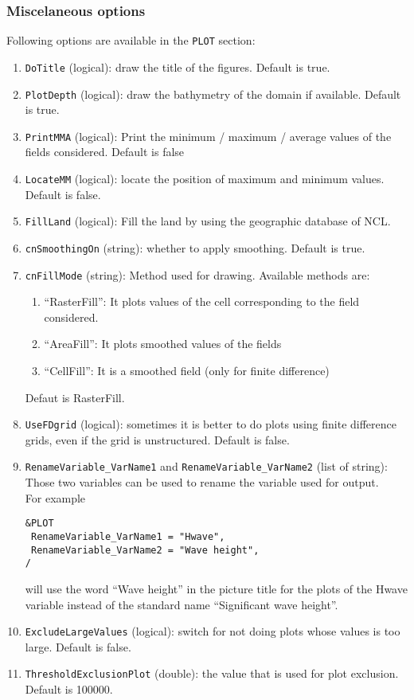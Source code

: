 \documentclass[12pt]{amsart}
\begin{document}
\subsubsection{Miscelaneous options}

Following options are available in the {\tt PLOT} section:
\begin{enumerate}
\item {\tt DoTitle} (logical): draw the title of the figures. Default is true.
\item {\tt PlotDepth} (logical): draw the bathymetry of the domain if available. Default is true.
\item {\tt PrintMMA} (logical): Print the minimum / maximum / average values of the fields considered. Default is false
\item {\tt LocateMM} (logical): locate the position of maximum and minimum values. Default is false.
\item {\tt FillLand} (logical): Fill the land by using the geographic database of NCL.
\item {\tt cnSmoothingOn} (string): whether to apply smoothing. Default is true.
\item {\tt cnFillMode} (string): Method used for drawing. Available methods are:
  \begin{enumerate}
  \item ``RasterFill'': It plots values of the cell corresponding to the field considered.
  \item ``AreaFill'': It plots smoothed values of the fields
  \item ``CellFill'': It is a smoothed field (only for finite difference)
  \end{enumerate}
  Defaut is RasterFill.
\item {\tt UseFDgrid} (logical): sometimes it is better to do plots
using finite difference grids, even if the grid is unstructured. Default is false.
\item {\tt RenameVariable\_VarName1} and {\tt RenameVariable\_VarName2} (list of string): Those two variables can be used to rename the variable used for output.\\
  For example
\begin{verbatim}
&PLOT
 RenameVariable_VarName1 = "Hwave", 
 RenameVariable_VarName2 = "Wave height", 
/
\end{verbatim}
will use the word ``Wave height'' in the picture title for the plots of the Hwave variable instead of the standard name ``Significant wave height''.
\item {\tt ExcludeLargeValues} (logical): switch for not doing plots whose values is too large. Default is false.
\item {\tt ThresholdExclusionPlot} (double): the value that is used for plot exclusion. Default is 100000.
\end{enumerate}
\end{document}
